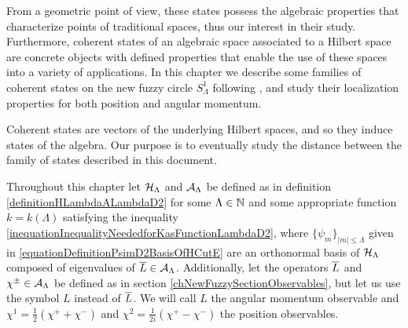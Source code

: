 










From a geometric point of view, these states possess the algebraic properties that characterize points of traditional spaces, thus our interest in their study. Furthermore, coherent states of an algebraic space associated to a Hilbert space  are concrete objects with defined properties that enable the use of these spaces into a variety of applications. In this chapter we describe some families of coherent states on the new fuzzy circle $S^1_\Lambda$ following \cite{FioreCoherent2020, FioreXi2020, FioreTheCase2020}, and study their localization properties for both position and angular momentum. 

Coherent states are vectors of the underlying Hilbert spaces, and so they induce states of the algebra. Our purpose is to eventually study the distance between the family of states described in this document.

Throughout this chapter let $\mathcal H_\Lambda$ and $\mathcal A_\Lambda$ be defined as in definition \ref{definitionHLambdaALambdaD2} for some $\Lambda \in \mathbb{N}$ and some appropriate function $k = k(\Lambda)$ satisfying the inequality \eqref{inequationInequalityNeededforKasFunctionLambdaD2}, where $\{\psi_m\}_{|m| \leq \Lambda}$ given in \eqref{equationDefinitionPsimD2BasisOfHCutE} are an orthonormal basis of $\mathcal H_\Lambda$ composed of eigenvalues of $\overline{L} \in \mathcal A_\Lambda$. Additionally, let the operators $\overline{L}$ and $\chi^\pm \in \mathcal A_\Lambda$ be defined as in section \ref{chNewFuzzySectionObservables}, but let us use the symbol $L$ instead of $\overline{L}$. We will call $L$ the angular momentum observable and $\chi^1 = \frac{1}{2}(\chi^+ + \chi^-)$ and $\chi^2 = \frac{1}{2i}(\chi^+ - \chi^-)$ the position observables.

